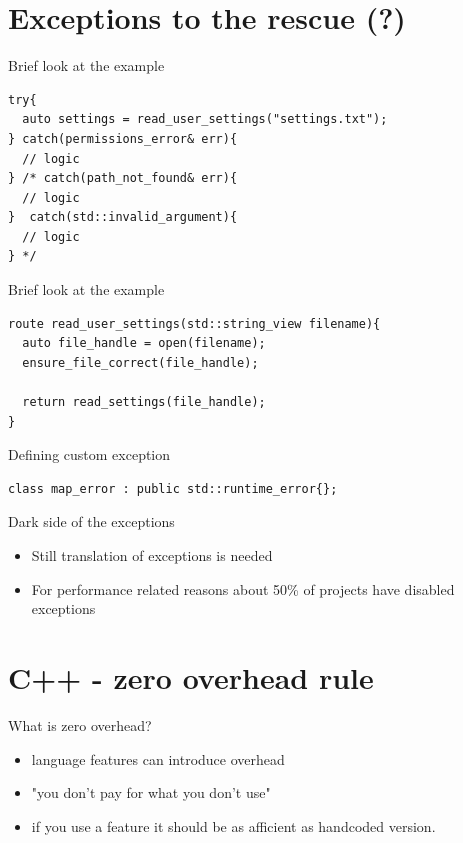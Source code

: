 \documentclass[10pt]{beamer}
\begin{document}
\section{Exceptions to the rescue (?)}

\begin{frame}[fragile]{Brief look at the example}
	\begin{verbatim}
try{
  auto settings = read_user_settings("settings.txt");
} catch(permissions_error& err){
  // logic
} /* catch(path_not_found& err){
  // logic
}  catch(std::invalid_argument){
  // logic
} */
	\end{verbatim}
\end{frame}

\begin{frame}[fragile]{Brief look at the example}
	\begin{verbatim}
route read_user_settings(std::string_view filename){
  auto file_handle = open(filename);
  ensure_file_correct(file_handle);

  return read_settings(file_handle);
}
	\end{verbatim}
\end{frame}

\begin{frame}[fragile]{Defining custom exception}
	\begin{verbatim}
class map_error : public std::runtime_error{};
	\end{verbatim}
\end{frame}

\begin{frame}[fragile]{Dark side of the exceptions}
	\begin{itemize}[<+- | alert@+>]
		\item Still translation of exceptions is needed
		\item For performance related reasons about 50\% of projects have disabled exceptions
	\end{itemize}
\end{frame}

\section{C++ - zero overhead rule}

\begin{frame}{What is zero overhead?}
	\begin{itemize}[<+- | alert@+>]
		\item language features {\color{amethyst}can} introduce overhead
		\item "you don't pay for what you don't use"
		\item if you use a feature it should be as afficient as handcoded version.
	\end{itemize}
\end{frame}
\end{document}
